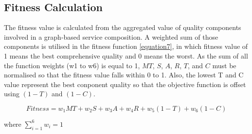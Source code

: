 \documentclass{llncs}
\begin{document}
\subsection{Fitness Calculation}
The fitness value is calculated from the aggregated value of quality components involved in a graph-based service composition. A weighted sum of those components is utilised in the fitness function \ref{equation7}, in which fitness value of 1 means the best comprehensive quality and 0 means the worst. As the sum of all the function weights (w1 to w6) is equal to 1, $MT$, $S$, $A$, $R$, $T$, and $C$ must be normalised so that the fitness value falls within 0 to 1. Also, the lowest T and C value represent the best conponent quality so that the objective function is offset using $(1 - T)$ and $(1 - C)$.

\begin{equation}
\label{equation7}
Fitness = w_1MT + w_2S + w_3A + w_4R + w_5(1 - T) + w_6(1 - C)
\end{equation}

\noindent where $\sum_{i=1}^{6} w_i = 1$
\end{document}
